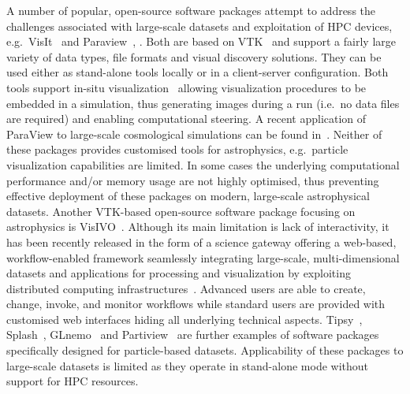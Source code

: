 \documentclass[preprint,5pt]{elsarticle}
\begin{document}
A number of popular, open-source software packages attempt to address the challenges associated with large-scale datasets and exploitation of HPC devices, e.g.\ VisIt~\cite{visit} and Paraview~\cite{paraview}, \cite{paraviewgrid}. Both are based on VTK~\cite{vtk} and support a fairly large variety of data types, file formats and visual discovery solutions. They can be used either as stand-alone tools locally or in a client-server configuration. Both tools support in-situ visualization~\cite{in-situ} allowing visualization procedures to be embedded in a simulation, thus generating images during a run (i.e.\ no data files are required) and enabling computational steering. A recent application of ParaView to large-scale cosmological simulations can be found in~\cite{2011ApJS..195...11W}. Neither of these packages provides customised tools for astrophysics, e.g.\ particle visualization capabilities are limited. In some cases the underlying computational performance and/or memory usage are not highly optimised, thus preventing effective deployment of these packages on modern, large-scale astrophysical datasets. Another VTK-based open-source software package focusing on astrophysics is VisIVO~\cite{visivo}. Although its main limitation is lack of interactivity, it has been recently released in the form of a science gateway offering a web-based, workflow-enabled framework seamlessly integrating large-scale, multi-dimensional datasets and applications for processing and visualization by exploiting distributed computing infrastructures~\cite{VisIVOGateway}. Advanced users are able to create, change, invoke, and monitor workflows while standard users are provided with customised web interfaces hiding all underlying technical aspects. Tipsy~\cite{tipsyurl}, Splash~\cite{splash}, GLnemo~\cite{glnemo} and Partiview~\cite{partiview} are further examples of software packages specifically designed for particle-based datasets. Applicability of these packages to large-scale datasets is limited as they operate in stand-alone mode without support for HPC resources.
\end{document}
